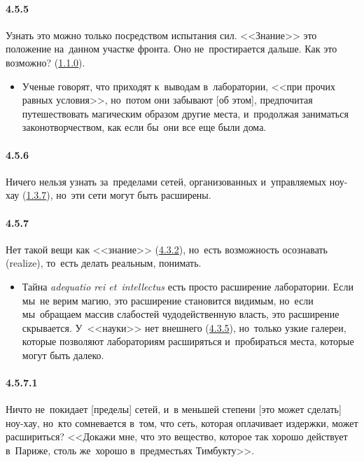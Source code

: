 \paragraph{4.5.5}\hypertarget{par:4.5.5}{} Узнать это можно только посредством испытания сил. <<Знание>> это положение на~данном участке фронта. Оно не~простирается дальше. Как это возможно? (\hyperlink{par:1.1.0}{1.1.0}).
	\begin{itemize}
	\item 
	Ученые говорят, что приходят к~выводам в~лаборатории, <<при прочих равных условия>>, но~потом они забывают [об этом], предпочитая путешествовать магическим образом другие места, и~продолжая заниматься законотворчеством, как если бы~они все еще были дома.
	\end{itemize}	


\paragraph{4.5.6}\hypertarget{par:4.5.6}{} Ничего нельзя узнать за~пределами сетей, организованных и~управляемых ноу-хау (\hyperlink{par:1.3.7}{1.3.7}), но~эти сети могут быть расширены.


\paragraph{4.5.7}\hypertarget{par:4.5.7}{} Нет такой вещи как <<знание>> (\hyperlink{par:4.3.2}{4.3.2}), но~есть возможность осознавать (realize), то~есть делать реальным, понимать. 
	\begin{itemize}
	\item 
	Тайна {\itshape adequatio rei et~intellectus} есть просто расширение лаборатории. Если мы~не верим магию, это расширение становится видимым, но~если мы~обращаем массив слабостей чудодейственную власть, это расширение скрывается. У~<<науки>> нет внешнего (\hyperlink{par:4.3.5}{4.3.5}), но~только узкие галереи, которые позволяют лабораториям расширяться и~пробираться места, которые могут быть далеко. 
	\end{itemize}	

\paragraph{4.5.7.1}\hypertarget{par:4.5.7.1}{} Ничто не~покидает [пределы] сетей, и~в меньшей степени [это может сделать] ноу-хау, но~кто сомневается в~том, что сеть, которая оплачивает издержки, может расшириться? <<Докажи мне, что это вещество, которое так хорошо действует в~Париже, столь же~хорошо в~предместьях Тимбукту>>.

